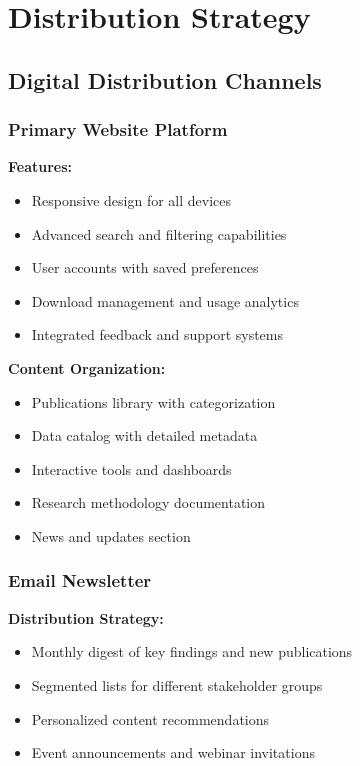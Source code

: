 \documentclass[11pt,a4paper]{article}
\begin{document}
\section{Distribution Strategy}

\subsection{Digital Distribution Channels}

\subsubsection{Primary Website Platform}
\textbf{Features:}
\begin{itemize}
    \item Responsive design for all devices
    \item Advanced search and filtering capabilities
    \item User accounts with saved preferences
    \item Download management and usage analytics
    \item Integrated feedback and support systems
\end{itemize}

\textbf{Content Organization:}
\begin{itemize}
    \item Publications library with categorization
    \item Data catalog with detailed metadata
    \item Interactive tools and dashboards
    \item Research methodology documentation
    \item News and updates section
\end{itemize}

\subsubsection{Email Newsletter}
\textbf{Distribution Strategy:}
\begin{itemize}
    \item Monthly digest of key findings and new publications
    \item Segmented lists for different stakeholder groups
    \item Personalized content recommendations
    \item Event announcements and webinar invitations
\end{itemize}
\end{document}
